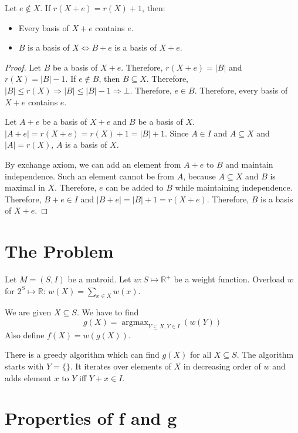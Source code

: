\begin{theorem}
\label{rank-p1-basis}
Let $e \not\in X$. If $r(X+e) = r(X) + 1$, then:
\begin{itemize}
\item Every basis of $X+e$ contains $e$.
\item $B$ is a basis of $X \iff B+e$ is a basis of $X+e$.
\end{itemize}
\end{theorem}
\begin{proof}
Let $B$ be a basis of $X+e$. Therefore, $r(X+e) = |B|$ and $r(X) = |B|-1$.
If $e \not\in B$, then $B \subseteq X$.
Therefore, $|B| \le r(X) \Rightarrow |B| \le |B|-1 \Rightarrow \bot$.
Therefore, $e \in B$. Therefore, every basis of $X+e$ contains $e$.

Let $A+e$ be a basis of $X+e$ and $B$ be a basis of $X$.
$|A+e| = r(X+e) = r(X) + 1 = |B| + 1$.
Since $A \in I$ and $A \subseteq X$ and $|A| = r(X)$, $A$ is a basis of $X$.

By exchange axiom, we can add an element from $A+e$ to $B$ and maintain independence.
Such an element cannot be from $A$, because $A \subseteq X$ and $B$ is maximal in $X$.
Therefore, $e$ can be added to $B$ while maintaining independence.
Therefore, $B+e \in I$ and $|B+e| = |B| + 1 = r(X+e)$.
Therefore, $B$ is a basis of $X+e$.
\end{proof}

\section{The Problem}

Let $M = (S, I)$ be a matroid.
Let $w: S \mapsto \mathbb{R}^+$ be a weight function.
Overload $w$ for $2^S \mapsto \mathbb{R}$: $w(X) = \sum_{x \in X} w(x)$.

We are given $X \subseteq S$.
We have to find
\[ g(X) = \operatorname{argmax}_{Y \subseteq X, Y \in I}(w(Y)) \]
Also define $f(X) = w(g(X))$.

\begin{theorem}
There is a greedy algorithm which can find $g(X)$ for all $X \subseteq S$.
The algorithm starts with $Y = \{\}$.
It iterates over elements of $X$ in decreasing order of $w$
and adds element $x$ to $Y$ iff $Y + x \in I$.
\end{theorem}

\section{Properties of f and g}

